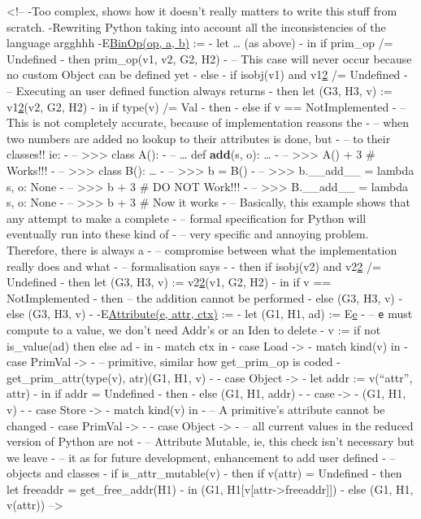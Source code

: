 \textless{}!-- -Too complex, shows how it doesn't really matters to
write this stuff from scratch. -Rewriting Python taking into account all
the inconsistencies of the language argghhh -E\href{G,\%20H}{BinOp(op,
a, b)} := - let \ldots{} (as above) - in if prim\_op /= Undefined - then
prim\_op(v1, v2, G2, H2) - -- This case will never occur because no
custom Object can be defined yet - else - if isobj(v1) and
v1\href{\%22__add__\%22}{2} /= Undefined - -- Executing an user defined
function always returns - then let (G3, H3, v) :=
v1\href{\%22__add__\%22}{2}(v2, G2, H2) - in if type(v) /= Val - then -
else if v == NotImplemented - -- This is not completely accurate,
because of implementation reasons the - -- when two numbers are added no
lookup to their attributes is done, but - -- to their classes!! ie: - --
\textgreater{}\textgreater{}\textgreater{} class A(): - -- \ldots{} def
\textbf{add}(s, o): \ldots{} - --
\textgreater{}\textgreater{}\textgreater{} A() + 3 \# Works!!! - --
\textgreater{}\textgreater{}\textgreater{} class B(): \ldots{} - --
\textgreater{}\textgreater{}\textgreater{} b = B() - --
\textgreater{}\textgreater{}\textgreater{} b.\_\_add\_\_ = lambda s, o:
None - -- \textgreater{}\textgreater{}\textgreater{} b + 3 \# DO NOT
Work!!! - -- \textgreater{}\textgreater{}\textgreater{} B.\_\_add\_\_ =
lambda s, o: None - -- \textgreater{}\textgreater{}\textgreater{} b + 3
\# Now it works - -- Basically, this example shows that any attempt to
make a complete - -- formal specification for Python will eventually run
into these kind of - -- very specific and annoying problem. Therefore,
there is always a - -- compromise between what the implementation really
does and what - -- formalisation says - - then if isobj(v2) and
v2\href{\%22__radd__\%22}{2} /= Undefined - then let (G3, H3, v) :=
v2\href{\%22__radd__\%22}{2}(v1, G2, H2) - in if v == NotImplemented -
then -- the addition cannot be performed - else (G3, H3, v) - else (G3,
H3, v) - -E\href{G,\%20H}{Attribute(e, attr, ctx)} := - let (G1, H1, ad)
:= E\href{G,\%20H}{e} - -- \texttt{e} must compute to a value, we don't
need Addr's or an Iden to delete - v := if not is\_value(ad) then else
ad - in - match ctx in - case Load -\textgreater{} - match kind(v) in -
case PrimVal -\textgreater{} - -- primitive, similar how get\_prim\_op
is coded - get\_prim\_attr(type(v), atr)(G1, H1, v) - - case Object
-\textgreater{} - let addr := v(\enquote{attr}, attr) - in if addr =
Undefined - then - else (G1, H1, addr) - - case -\textgreater{} - (G1,
H1, v) - - case Store -\textgreater{} - match kind(v) in - -- A
primitive's attribute cannot be changed - case PrimVal -\textgreater{} -
- case Object -\textgreater{} - -- all current values in the reduced
version of Python are not - -- Attribute Mutable, ie, this check isn't
necessary but we leave - -- it as for future development, enhancement to
add user defined - -- objects and classes - if is\_attr\_mutable(v) -
then if v(attr) = Undefined - then let freeaddr = get\_free\_addr(H1) -
in (G1, H1{[}v{[}attr-\textgreater{}freeaddr{]}{]}) - else (G1, H1,
v(attr)) --\textgreater{} \fi


